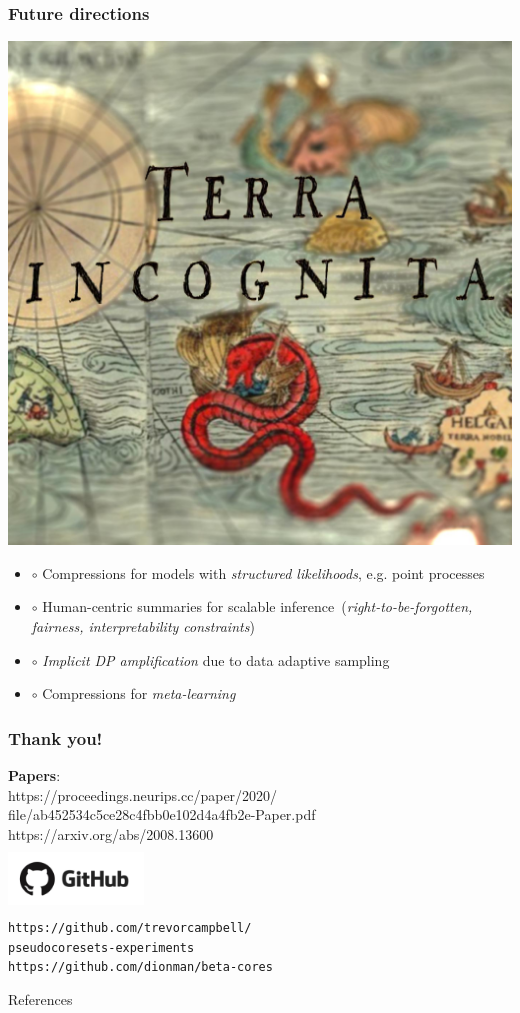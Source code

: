 \documentclass[hyperref={colorlinks = true},unknownkeysallowed]{beamer}
\begin{document}
\begin{frame}
	\frametitle{Future directions}
	\vspace{-1.7cm}
	\flushright \includegraphics[width=.49\textwidth]{figs/terra-incognita.png}	
	\begin{itemize}
	\item $\circ$ Compressions for models with \emph{structured likelihoods}, e.g. point processes
	\item $\circ$ Human-centric summaries for scalable inference~(\emph{right-to-be-forgotten, fairness, interpretability constraints})
	\item $\circ$ \emph{Implicit DP amplification} due to data adaptive sampling
	\item $\circ$ Compressions for \emph{meta-learning}
	\end{itemize}
\end{frame}


\begin{frame}
	\frametitle{Thank you!}
	\centering
	\large{\textbf{Papers}}:\\ {https://proceedings.neurips.cc/paper/2020/\\file/ab452534c5ce28c4fbb0e102d4a4fb2e-Paper.pdf}\\{https://arxiv.org/abs/2008.13600}\\
	\vspace{1cm}
	\includegraphics[width=3.6cm,height=1.8cm]{figs/github-logo.png}\\
	\texttt{https://github.com/trevorcampbell/\\pseudocoresets-experiments}\\ \texttt{https://github.com/dionman/beta-cores}
\end{frame}


\begin{frame}[allowframebreaks]{References}
	\tiny %
	
\end{frame}
\end{document}
